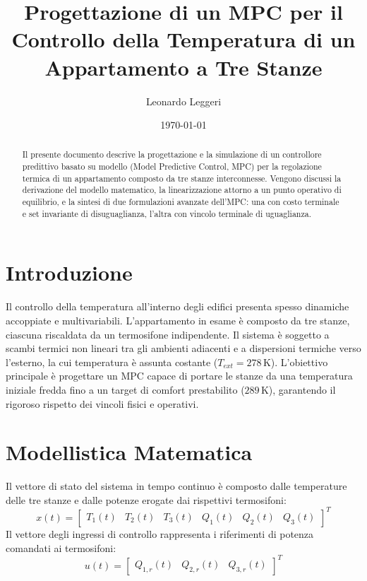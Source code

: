 \documentclass[12pt,a4paper]{article}
\title{\textbf{Progettazione di un MPC per il Controllo della Temperatura di un Appartamento a Tre Stanze}}
\author{Leonardo Leggeri}
\date{\today}
\begin{document}
\maketitle

\begin{abstract}
Il presente documento descrive la progettazione e la simulazione di un controllore predittivo basato su modello (Model Predictive Control, MPC) per la regolazione termica di un appartamento composto da tre stanze interconnesse. Vengono discussi la derivazione del modello matematico, la linearizzazione attorno a un punto operativo di equilibrio, e la sintesi di due formulazioni avanzate dell'MPC: una con costo terminale e set invariante di disuguaglianza, l'altra con vincolo terminale di uguaglianza.
\end{abstract}

\section{Introduzione}
Il controllo della temperatura all'interno degli edifici presenta spesso dinamiche accoppiate e multivariabili. L'appartamento in esame \`e composto da tre stanze, ciascuna riscaldata da un termosifone indipendente. Il sistema \`e soggetto a scambi termici non lineari tra gli ambienti adiacenti e a dispersioni termiche verso l'esterno, la cui temperatura \`e assunta costante ($T_{ext} = 278$\,K). L'obiettivo principale \`e progettare un MPC capace di portare le stanze da una temperatura iniziale fredda fino a un target di comfort prestabilito ($289$\,K), garantendo il rigoroso rispetto dei vincoli fisici e operativi.

\section{Modellistica Matematica}
Il vettore di stato del sistema in tempo continuo \`e composto dalle temperature delle tre stanze e dalle potenze erogate dai rispettivi termosifoni:
\begin{equation}
    x(t) = \begin{bmatrix} T_1(t) & T_2(t) & T_3(t) & Q_1(t) & Q_2(t) & Q_3(t) \end{bmatrix}^T
\end{equation}
Il vettore degli ingressi di controllo rappresenta i riferimenti di potenza comandati ai termosifoni:
\begin{equation}
    u(t) = \begin{bmatrix} Q_{1,r}(t) & Q_{2,r}(t) & Q_{3,r}(t) \end{bmatrix}^T
\end{equation}
\end{document}
